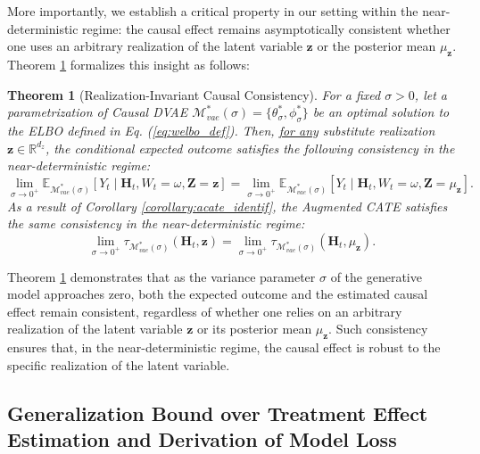 \documentclass[10pt]{article} %
\newtheorem{theorem}{Theorem}
\begin{document}
More importantly, we establish a critical property in our setting within the near-deterministic regime: the causal effect remains asymptotically consistent whether one uses an arbitrary realization of the latent variable \(\mathbf{z}\) or the posterior mean \(\mu_{\mathbf{z}}\). Theorem \ref{thm:sigma_to_0} formalizes this insight as follows: %
\begin{theorem}[Realization-Invariant Causal Consistency]
\label{thm:sigma_to_0}
For a fixed $\sigma > 0$, let a parametrization of Causal DVAE \(\mathcal{M}_{vae}^*(\sigma) = \{\theta_{\sigma}^*, \phi_{\sigma}^*\}\) be an optimal solution to the ELBO defined in Eq. (\ref{eq:welbo_def}). Then, \underline{for any} substitute realization \(\mathbf{z} \in \mathbb{R}^{d_z}\), the conditional expected outcome satisfies the following consistency in the near-deterministic regime:
\begin{equation}
    \lim_{\sigma \to 0^+} \mathbb{E}_{\mathcal{M}_{vae}^*(\sigma)}\left[ Y_t \mid \mathbf{H}_{t}, W_t = \omega, \mathbf{Z}= \mathbf{z} \right] 
    = \lim_{\sigma \to 0^+} \mathbb{E}_{\mathcal{M}_{vae}^*(\sigma)}\left[ Y_t \mid \mathbf{H}_{t}, W_t = \omega, \mathbf{Z}= \mu_{\mathbf{z}} \right].
\end{equation}
As a result of Corollary \ref{corollary:acate_identif}, the Augmented CATE satisfies the same consistency in the near-deterministic regime:
\begin{equation}
    \lim_{\sigma \to 0^+} \tau_{\mathcal{M}_{vae}^*(\sigma)}(\mathbf{H}_{t}, \mathbf{z}) 
    = \lim_{\sigma \to 0^+} \tau_{\mathcal{M}_{vae}^*(\sigma)}(\mathbf{H}_{t}, \mu_{\mathbf{z}}).
\end{equation}
\end{theorem}
Theorem \ref{thm:sigma_to_0} demonstrates that as the variance parameter \(\sigma\) of the generative model approaches zero, both the expected outcome and the estimated causal effect remain consistent, regardless of whether one relies on an arbitrary realization of the latent variable \(\mathbf{z}\) or its posterior mean \(\mu_{\mathbf{z}}\). Such consistency ensures that, in the near-deterministic regime, the causal effect is robust to the specific realization of the latent variable. %


\subsection{Generalization Bound over Treatment Effect Estimation and Derivation of Model Loss}
\label{sect:gen_bound_tot_loss}
\end{document}
